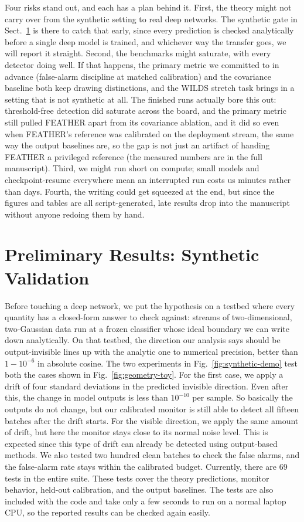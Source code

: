 \documentclass[graybox]{SNmult}
\begin{document}
Four risks stand out, and each has a plan behind it. First, the theory
might not carry over from the synthetic setting to real deep networks.
The synthetic gate in Sect.~\ref{sec:synthetic} is there to catch that
early, since every prediction is checked analytically before a single
deep model is trained, and whichever way the transfer goes, we will
report it straight. Second, the benchmarks might saturate, with every
detector doing well. If that happens, the primary metric we committed to
in advance (false-alarm discipline at matched calibration) and the
covariance baseline both keep drawing distinctions, and the WILDS
stretch task brings in a setting that is not synthetic at all. The
finished runs actually bore this out: threshold-free detection did
saturate across the board, and the primary metric still pulled FEATHER
apart from its covariance ablation, and it did so even when FEATHER's
reference was calibrated on the deployment stream, the same way the
output baselines are, so the gap is not just an artifact of handing
FEATHER a privileged reference (the measured numbers are in the full
manuscript). Third, we might run short on compute; small models and
checkpoint-resume everywhere mean an interrupted run costs us minutes
rather than days. Fourth, the writing could get squeezed at the end, but
since the figures and tables are all script-generated, late results drop
into the manuscript without anyone redoing them by hand.

\section{Preliminary Results: Synthetic Validation}
\label{sec:synthetic}

Before touching a deep network, we put the hypothesis on a testbed where
every quantity has a closed-form answer to check against: streams of
two-dimensional, two-Gaussian data run at a frozen classifier whose
ideal boundary we can write down analytically. On that testbed, the
direction our analysis says should be output-invisible lines up with the
analytic one to numerical precision, better than $1 - 10^{-6}$ in
absolute cosine. The two experiments in Fig.~\ref{fig:synthetic-demo}
test both the cases shown in Fig.~\ref{fig:geometry-toy}. For the first case, we apply a drift of four standard deviations in the predicted invisible direction. Even after this, the change in model outputs is less than $10^{-10}$ per sample. So basically the outputs do not change, but our calibrated monitor is still able to detect all fifteen batches after the drift starts. For the visible direction, we apply the same amount of drift, but here the monitor stays close to its normal noise level. This is expected since this type of drift can already be detected using output-based methods.
We also tested two hundred clean batches to check the false alarms, and the false-alarm rate stays within the calibrated budget. Currently, there are 69 tests in the entire suite. These tests cover the theory predictions, monitor behavior, held-out calibration, and the output baselines. The tests are also included with the code and take only a few seconds to run on a normal laptop CPU, so the reported results can be checked again easily.
\end{document}
